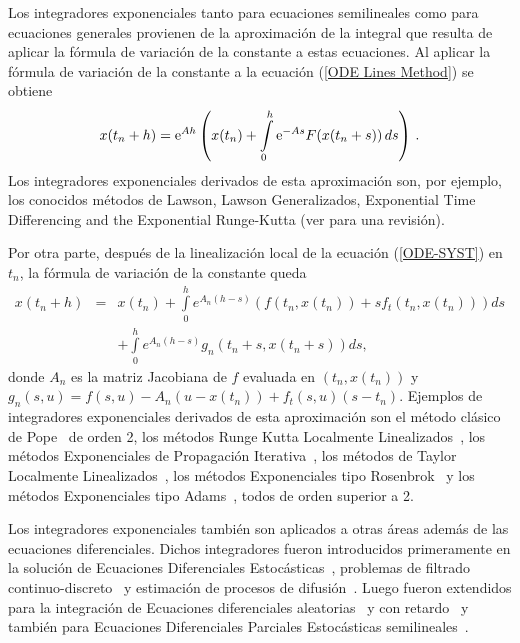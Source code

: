 Los integradores exponenciales tanto para ecuaciones semilineales como para ecuaciones generales provienen de la aproximación de la integral
que resulta de aplicar la fórmula de variación de la constante a estas ecuaciones. Al aplicar la fórmula de variación
de la constante a la ecuación (\ref{ODE Lines Method}) se obtiene
\begin{equation}
x(t_n+h)=\mathrm{e}^{Ah}\left(x(t_n) +\int\limits_{0}^{h} \mathrm{e}^{-As}F(x(t_n+s)) \,ds\right)\,. \label{VCF2}
\end{equation}
Los integradores exponenciales derivados de esta aproximación son, por ejemplo, los conocidos métodos de Lawson, Lawson Generalizados, Exponential Time
Differencing and the Exponential Runge-Kutta (ver \cite{Berland07} para una revisión). 

Por otra parte, después de la linealización local de la ecuación (\ref{ODE-SYST}) en $t_{n}$,  la fórmula de variación
de la constante queda
\begin{eqnarray}
x(t_{n}+h) &= & x(t_{n})+\int\limits_{0}^{h}e^{A	_{n}(h-s)}(f(t_n,x(t_{n}))+sf_t(t_n,x(t_{n})))ds \nonumber \\
 & & +\int\limits_{0}^{h}e^{A
	_{n}(h-s)}g_{n}(t_{n}+s,x(t_{n}+s))ds, \label{VCF}
\end{eqnarray}
donde $A_{n}$ es la matriz Jacobiana de $f$ evaluada en $(t_n,x(t_{n}))$ y $g_{n}(s,u)=f(s,u)-A_{n}(u-x(t_n))+f_t(s,u)(s-t_n)$. 
Ejemplos de integradores exponenciales derivados de esta aproximación son el método clásico de Pope~\cite{pope1963exponential} de orden 2, los métodos Runge Kutta Localmente 
Linealizados~\cite{delaCruz06,Jimenez13,Jimenez14AMC}, los métodos Exponenciales de Propagación 
Iterativa~\cite{tokman2013comparative}, los métodos de Taylor Localmente Linealizados~\cite{delaCruz07}, los
métodos Exponenciales tipo Rosenbrok~\cite{hochbruck2009exponential} y los métodos Exponenciales tipo Adams~\cite{hochbruck2011exponential}, todos de orden superior a 2.

Los integradores exponenciales también son aplicados a otras áreas además de las ecuaciones diferenciales. Dichos integradores fueron introducidos primeramente en la solución de Ecuaciones Diferenciales Estocásticas~\cite{ozaki19852,ozaki1985statistical}, problemas de filtrado continuo-discreto~\cite{ozaki1993local} y estimación de procesos de difusión~\cite{ozaki19852,ozaki1985statistical,ozaki1994local}. Luego fueron extendidos para la integración de Ecuaciones diferenciales aleatorias~\cite{carbonell2005local} y con retardo~\cite{jimenez2006local} y también para Ecuaciones Diferenciales
Parciales Estocásticas semilineales~\cite{jentzen2009overcoming,kloeden2011exponential}.

